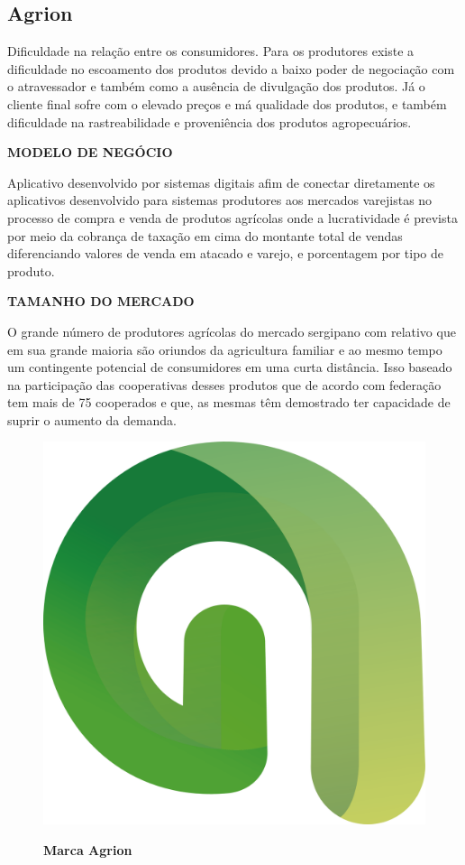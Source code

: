 \subsection{Agrion}

Dificuldade na relação entre os consumidores. Para os produtores existe a dificuldade no escoamento dos produtos devido a baixo poder de negociação com o atravessador e também como a ausência  de divulgação dos produtos. Já o cliente final sofre com o elevado preços e má qualidade dos produtos, e também dificuldade na rastreabilidade e proveniência dos produtos agropecuários.

\textbf{MODELO DE NEGÓCIO}

Aplicativo desenvolvido por sistemas digitais afim de conectar diretamente os aplicativos desenvolvido para sistemas produtores aos mercados varejistas no processo de compra e venda de produtos agrícolas onde a lucratividade é prevista por meio da cobrança de taxação em cima do montante total de vendas diferenciando valores de venda em atacado e varejo, e porcentagem por tipo de produto.

\textbf{TAMANHO DO MERCADO}

O grande número de produtores agrícolas  do mercado sergipano com relativo que  em sua grande maioria são oriundos da agricultura familiar e ao mesmo tempo um contingente potencial de consumidores em uma curta distância. Isso baseado na  participação das cooperativas desses produtos que de acordo 
com federação tem mais de 75 cooperados e que, as mesmas têm demostrado ter capacidade de suprir o aumento da demanda.


\begin{figure}[!htb]
\centering
\caption{\textbf{Marca Agrion}}
\includegraphics[scale=0.2]{Imagens/agrion.png}
\label{figura_14}
\end{figure}
\newpage

